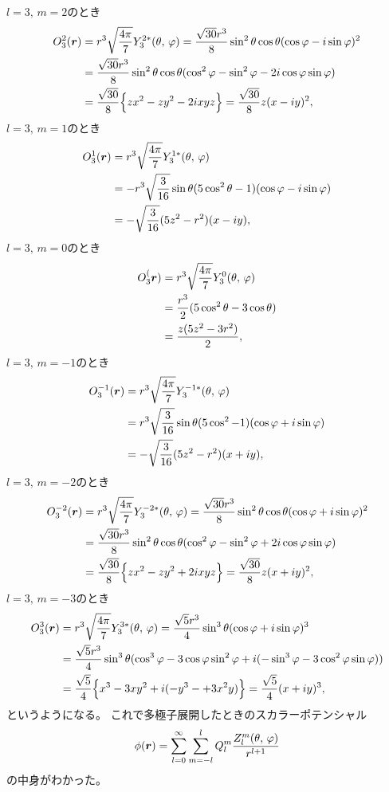\documentclass[../../master.tex]{subfiles}
\begin{document}
\(l=3,\,m=2\)のとき
\begin{align}
    O_3^2(\vb*{r})
    &= r^3 \sqrt{\frac{4\pi}{7}} Y_3^{2*}(\theta,\,\varphi)
    = \frac{\sqrt{30}r^3}{8} \sin^2\theta \cos\theta (\cos\varphi-i\sin\varphi)^2\\
    &= \frac{\sqrt{30}r^3}{8} \sin^2\theta \cos\theta (\cos^2\varphi - \sin^2\varphi - 2i\cos\varphi\sin\varphi)\\
    &= \frac{\sqrt{30}}{8} \Big\{zx^2-zy^2 -2ixyz\Big\}
    = \frac{\sqrt{30}}{8} z(x-iy)^2,
\end{align}
\(l=3,\,m=1\)のとき
\begin{align}
    O_3^1(\vb*{r})
    &= r^3 \sqrt{\frac{4\pi}{7}} Y_3^{1*}(\theta,\,\varphi)\\
    &= -r^3 \sqrt{\frac{3}{16}} \sin\theta(5\cos^2\theta-1)(\cos\varphi-i\sin\varphi)\\
    &=-\sqrt{\frac{3}{16}}(5z^2-r^2)(x-iy),
\end{align}
\(l=3,\,m=0\)のとき
\begin{align}
    O_3^(\vb*{r})
    &= r^3 \sqrt{\frac{4\pi}{7}} Y_3^{0}(\theta,\,\varphi)\\
    &= \frac{r^3}{2}  (5\cos^2\theta-3\cos\theta)\\
    &= \frac{z(5z^2-3r^2)}{2},
\end{align}
\(l=3,\,m=-1\)のとき
\begin{align}
    O_3^{-1}(\vb*{r})
    &= r^3 \sqrt{\frac{4\pi}{7}} Y_3^{-1*}(\theta,\,\varphi)\\
    &= r^3 \sqrt{\frac{3}{16}} \sin\theta(5\cos^2-1)(\cos\varphi+i\sin\varphi)\\
    &=-\sqrt{\frac{3}{16}}(5z^2-r^2)(x+iy),
\end{align}
\(l=3,\,m=-2\)のとき
\begin{align}
    O_3^{-2}(\vb*{r})
    &= r^3 \sqrt{\frac{4\pi}{7}} Y_3^{-2*}(\theta,\,\varphi)
    = \frac{\sqrt{30}r^3}{8} \sin^2\theta \cos\theta (\cos\varphi+i\sin\varphi)^2\\
    &= \frac{\sqrt{30}r^3}{8} \sin^2\theta \cos\theta (\cos^2\varphi - \sin^2\varphi + 2i\cos\varphi\sin\varphi)\\
    &= \frac{\sqrt{30}}{8} \Big\{zx^2-zy^2 + 2ixyz\Big\}
    = \frac{\sqrt{30}}{8} z(x+iy)^2,
\end{align}
\(l=3,\,m=-3\)のとき
\begin{align}
    O_3^3(\vb*{r})
    &= r^3 \sqrt{\frac{4\pi}{7}} Y_3^{3*}(\theta,\,\varphi)
    = \frac{\sqrt{5}r^3}{4} \sin^3\theta (\cos\varphi+i\sin\varphi)^3\\
    &= \frac{\sqrt{5}r^3}{4} \sin^3\theta (\cos^3\varphi - 3\cos\varphi\sin^2\varphi + i(-\sin^3\varphi - 3\cos^2\varphi\sin\varphi))\\
    &= \frac{\sqrt{5}}{4} \Big\{x^3-3xy^2+i(-y^3-+3x^2y)\Big\}
    = \frac{\sqrt{5}}{4} (x+iy)^3,
\end{align}
というようになる。
これで多極子展開したときのスカラーポテンシャル
\begin{equation}
    \phi(\vb*{r}) = \sum_{l=0}^{\infty} \sum_{m=-l}^{l} Q_l^m\frac{Z_l^m(\theta,\,\varphi)}{r^{l+1}}
\end{equation}
の中身がわかった。
\end{document}
